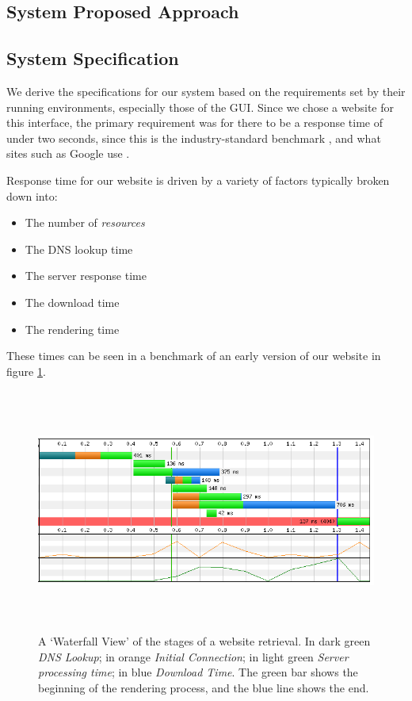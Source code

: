 

\subsection{System Proposed Approach}

\subsection{System Specification}

We derive the specifications for our system based on the requirements
set by their running environments, especially those of the GUI. Since
we chose a website for this interface, the primary requirement was for
there to be a response time of under two seconds, since this is the
industry-standard benchmark \cite{akamai}, and what sites such as
Google use \cite{two-seconds}.

Response time for our website is driven by a variety of factors
typically broken down into:

\begin{itemize}
  \item The number of \emph{resources}
  \item The DNS lookup time
  \item The server response time
  \item The download time
  \item The rendering time
\end{itemize}

These times can be seen in a benchmark of an early version of our
website in figure \ref{fig-website-benchmark}.

\begin{figure}[htp]
  \centering
  \includegraphics[height=8cm]{graphics/performance.png}
  \caption{A `Waterfall View' of the stages of a website retrieval. In
  dark green \emph{DNS Lookup}; in orange \emph{Initial Connection};
  in light green \emph{Server processing time}; in blue \emph{Download
  Time}. The green bar shows the beginning of the rendering process,
and the blue line shows the end.}
  \label{fig-website-benchmark}
\end{figure}

